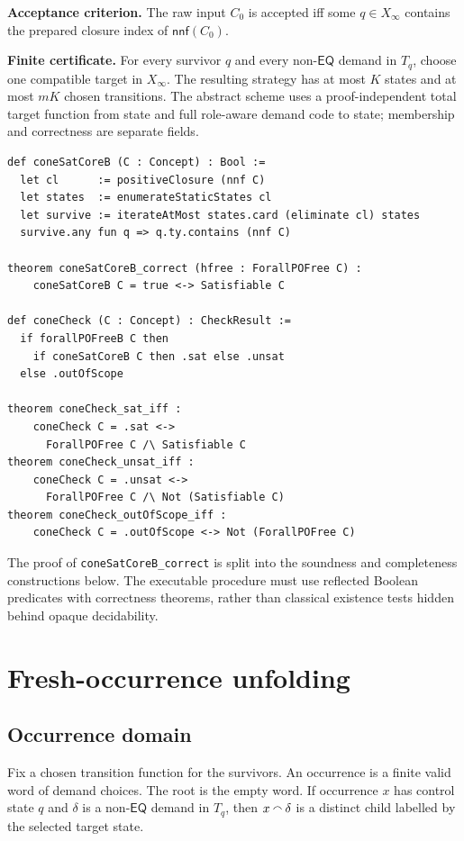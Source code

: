 \documentclass[11pt]{article}
\newcommand{\EQ}{\mathsf{EQ}}
\begin{document}
\textbf{Acceptance criterion.}
The raw input $C_0$ is accepted iff some $q\in X_\infty$ contains the prepared closure
index of $\mathsf{nnf}(C_0)$.

\textbf{Finite certificate.}
For every survivor $q$ and every non-$\EQ$ demand in $T_q$, choose one compatible target
in $X_\infty$. The resulting strategy has at most $K$ states and at most $mK$
chosen transitions. The abstract scheme uses a proof-independent total target function
from state and full role-aware demand code to state; membership and correctness are
separate fields.

\begin{lstlisting}
def coneSatCoreB (C : Concept) : Bool :=
  let cl      := positiveClosure (nnf C)
  let states  := enumerateStaticStates cl
  let survive := iterateAtMost states.card (eliminate cl) states
  survive.any fun q => q.ty.contains (nnf C)

theorem coneSatCoreB_correct (hfree : ForallPOFree C) :
    coneSatCoreB C = true <-> Satisfiable C

def coneCheck (C : Concept) : CheckResult :=
  if forallPOFreeB C then
    if coneSatCoreB C then .sat else .unsat
  else .outOfScope

theorem coneCheck_sat_iff :
    coneCheck C = .sat <->
      ForallPOFree C /\ Satisfiable C
theorem coneCheck_unsat_iff :
    coneCheck C = .unsat <->
      ForallPOFree C /\ Not (Satisfiable C)
theorem coneCheck_outOfScope_iff :
    coneCheck C = .outOfScope <-> Not (ForallPOFree C)
\end{lstlisting}

The proof of \texttt{coneSatCoreB\_correct} is split into the soundness and completeness
constructions below. The executable procedure must use reflected Boolean predicates with
correctness theorems, rather than classical existence tests hidden behind opaque
decidability.

\section{Fresh-occurrence unfolding}

\subsection{Occurrence domain}

Fix a chosen transition function for the survivors. An occurrence is a finite valid word
of demand choices. The root is the empty word. If occurrence $x$ has control state $q$
and $\delta$ is a non-$\EQ$ demand in $T_q$, then $x\mathbin{\raisebox{0.2ex}{\(\smallfrown\)}}\delta$
is a distinct child labelled by the selected target state.
\end{document}
